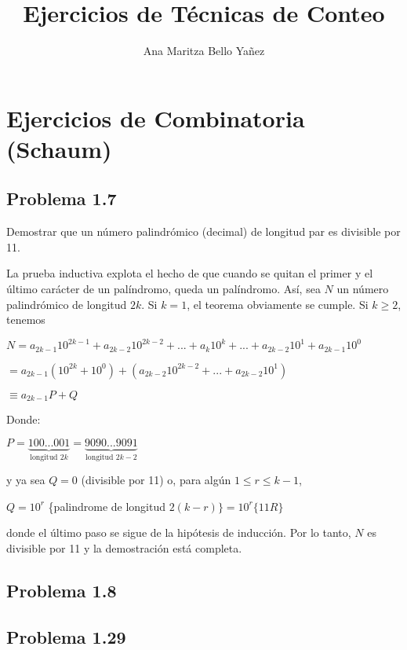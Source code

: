 \documentclass[12pt]{article}
\begin{document}
\title{Ejercicios de Técnicas de Conteo}
\author{Ana Maritza Bello Ya\~nez}
\maketitle
\setlength{\parindent}{0pt}
\setlength{\parskip}{1em}

\section*{Ejercicios de Combinatoria (Schaum)}

\subsection*{Problema 1.7}
Demostrar que un número palindrómico (decimal) de longitud par es divisible por
11.

La prueba inductiva explota el hecho de que cuando se quitan el primer y el
último carácter de un palíndromo, queda un palíndromo. Así, sea $N$ un número
palindrómico de longitud $2k$. Si $k = 1$, el teorema obviamente se cumple. Si
$k \geq 2$, tenemos

$ N = a_{2k-1} 10^{2k-1} + a_{2k-2} 10^{2k-2} + ... + a_{k} 10^{k} + ... +
a_{2k-2} 10^{1} + a_{2k-1} 10^{0} $

$ = a_{2k-1}(10^{2k}+10^0) + (a_{2k-2}10^{2k-2}+...+ a_{2k-2}10^{1}) $

$ \equiv a_{2k-1} P + Q$

Donde:

$P = \underbrace{100...001}_{\text{longitud } 2k} =
\underbrace{9090...9091}_{\text{longitud } 2k-2}$

y ya sea $Q=0$ (divisible por 11) o, para algún $1 \leq r \leq k-1$,

$Q = 10^r$ \{palindrome de longitud $ 2(k-r)\} = 10^r\{11R\} $

donde el último paso se sigue de la hipótesis de inducción. Por lo tanto, $N$ es
divisible por 11 y la demostración está completa.

\subsection*{Problema 1.8}


\subsection*{Problema 1.29}
\end{document}
